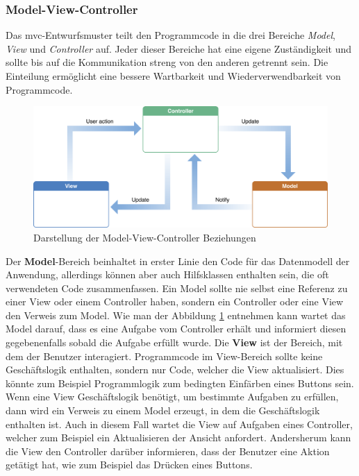 \subsubsection{Model-View-Controller}
Das \ac{mvc}-Entwurfsmuster teilt den Programmcode in die drei Bereiche \textit{Model}, \textit{View} und \textit{Controller} auf.
Jeder dieser Bereiche hat eine eigene Zuständigkeit und sollte bis auf die Kommunikation streng von den anderen getrennt sein.
Die Einteilung ermöglicht eine bessere Wartbarkeit und Wiederverwendbarkeit von Programmcode.\\[10pt]
\begin{figure}[h!]
	\centering
	\includegraphics[scale=0.3]{images/model-view-controller}
	\caption{Darstellung der Model-View-Controller Beziehungen \parencite{APP2018}}
	\label{fig:model-view-controller}
\end{figure}
\pbreak%
Der \textbf{Model}-Bereich beinhaltet in erster Linie den Code für das Datenmodell der Anwendung, allerdings können aber auch Hilfsklassen enthalten sein, die oft verwendeten Code zusammenfassen.
Ein Model sollte nie selbst eine Referenz zu einer View oder einem Controller haben, sondern ein Controller oder eine View den Verweis zum Model.
Wie man der Abbildung \ref{fig:model-view-controller} entnehmen kann wartet das Model darauf, dass es eine Aufgabe vom Controller erhält und informiert diesen gegebenenfalls sobald die Aufgabe erfüllt wurde.\pbreak%
%
Die \textbf{View} ist der Bereich, mit dem der Benutzer interagiert.
Programmcode im View-Bereich sollte keine Geschäftslogik enthalten, sondern nur Code, welcher die View aktualisiert.
Dies könnte zum Beispiel Programmlogik zum bedingten Einfärben eines Buttons sein.
Wenn eine View Geschäftslogik benötigt, um bestimmte Aufgaben zu erfüllen, dann wird ein Verweis zu einem Model erzeugt, in dem die Geschäftslogik enthalten ist.
Auch in diesem Fall wartet die View auf Aufgaben eines Controller, welcher zum Beispiel ein Aktualisieren der Ansicht anfordert.
Andersherum kann die View den Controller darüber informieren, dass der Benutzer eine Aktion getätigt hat, wie zum Beispiel das Drücken eines Buttons.\pbreak%
